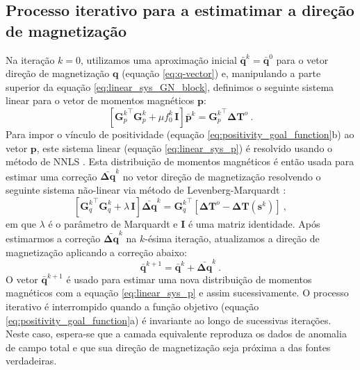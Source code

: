 \subsection{Processo iterativo para a estimatimar a direção de magnetização}
\label{subsec:iterative-proccess}

Na iteração $k=0$, utilizamos uma aproximação inicial $\bar{\mathbf{q}}^{k} = \bar{\mathbf{q}}^{0}$ 
para o vetor direção de magnetização $\mathbf{q}$ (equação \ref{eq:q-vector}) e, manipulando a 
parte superior da equação \ref{eq:linear_sys_GN_block}, definimos o seguinte sistema linear 
para o vetor de momentos magnéticos $\mathbf{p}$:
\begin{equation}
\left[ {\mathbf{G}_{p}^{k}}^{\top} \mathbf{G}_{p}^{k} + 
\mu f_{0}^{k} \, \mathbf{I} \right] \bar{\mathbf{p}}^{k} = 
{\mathbf{G}_{p}^{k}}^{\top} \mathbf{\Delta T}^{o} \: .
\label{eq:linear_sys_p}
\end{equation}
Para impor o vínculo de positividade (equação \ref{eq:positivity_goal_function}b) ao vetor $\mathbf{p}$, este sistema 
linear (equação \ref{eq:linear_sys_p}) é resolvido usando o método de NNLS \citep{lawson_hanson_1974, silvadias_etal_2007}. 
Esta distribuição de momentos magnéticos é então usada para estimar uma correção $\bar{\mathbf{\Delta q}}^{k}$ no vetor 
direção de magnetização resolvendo o seguinte sistema não-linear via método de Levenberg-Marquardt 
\citep{aster2005}:
\begin{equation}
\left[ {\mathbf{G}_{q}^{k}}^{\top} \mathbf{G}_{q}^{k} + \lambda \, \mathbf{I} \right] 
\bar{\mathbf{\Delta q}}^{k} = {\mathbf{G}_{q}^{k}}^{\top} 
\left[ \mathbf{\Delta T}^{o} - \mathbf{\Delta T} (\mathbf{s}^{k}) \right] \: ,
\label{eq:linear_sys_q}
\end{equation}
em que $\lambda$ é o parâmetro de Marquardt e $\mathbf{I}$ é uma matriz identidade. Após estimarmos a correção 
$\bar{\mathbf{\Delta q}}^{k}$ na $k$-ésima iteração, atualizamos a direção de magnetização 
aplicando a correção abaixo:
\begin{equation}
\bar{\mathbf{q}}^{k+1} = \bar{\mathbf{q}}^{k} + \bar{\mathbf{\Delta q}}^{k} \: .
\label{eq:q_next}
\end{equation}
O vetor $\bar{\mathbf{q}}^{k+1}$ é usado para estimar uma nova distribuição de momentos magnéticos com a equação 
\ref{eq:linear_sys_p} e assim sucessivamente. O processo iterativo é interrompido quando a função objetivo 
(equação \ref{eq:positivity_goal_function}a) é invariante ao longo de sucessivas iterações. Neste 
caso, espera-se que a camada equivalente reproduza os dados de anomalia de campo total e 
que sua direção de magnetização seja próxima a das fontes verdadeiras.

